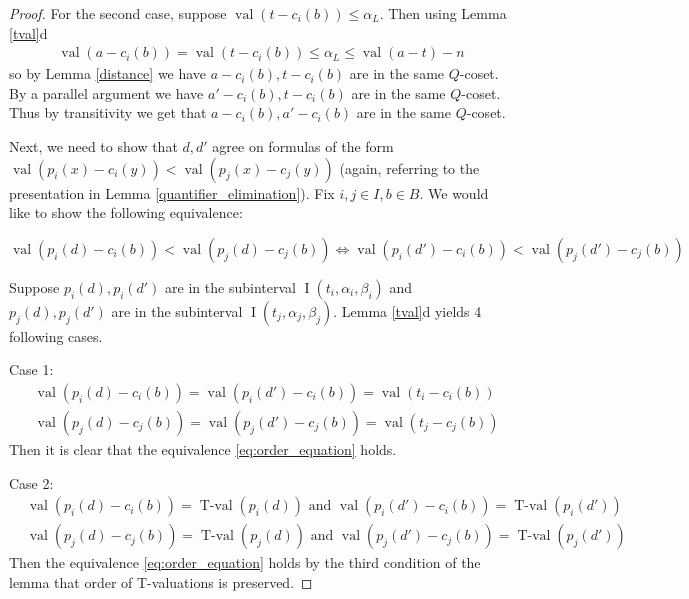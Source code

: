 \documentclass{amsart}
\DeclareMathOperator{\val}{val}
\DeclareMathOperator{\vval}{val}
\DeclareMathOperator{\tval}{T-val}
\DeclareMathOperator{\inti}{I}
\begin{document}
\begin{proof}
  For the second case, suppose $\val(t - c_i(b)) \leq \alpha_L$.
  Then using Lemma \ref{tval}d
  \begin{align*}
    \val(a - c_i(b)) = \val(t - c_i(b)) \leq \alpha_L \leq \val(a - t) - n
  \end{align*}
  so by Lemma \ref{distance} we have $a - c_i(b), t - c_i(b)$ are in the same $Q$-coset.
  By a parallel argument we have $a' - c_i(b), t - c_i(b)$ are in the same $Q$-coset.
  Thus by transitivity we get that $a - c_i(b), a' - c_i(b)$ are in the same $Q$-coset.

  Next, we need to show that $d, d'$ agree on formulas of the form
  $\vval (p_i(x) - c_i(y)) < \vval (p_j(x) - c_j(y))$ 
  (again, referring to the presentation in Lemma \ref{quantifier_elimination}).
  Fix $i,j \in I, b \in B$.
  We would like to show the following equivalence: 

  \begin{equation} \label {eq:order_equation}
	  \vval (p_i(d) - c_i(b)) < \vval (p_j(d) - c_j(b))  	  \iff \vval (p_i(d') - c_i(b)) < \vval (p_j(d') - c_j(b))
  \end{equation}

  Suppose $p_i(d), p_i(d')$ are in the subinterval $\inti(t_i, \alpha_i, \beta_i)$ and 
  $p_j(d), p_j(d')$ are in the subinterval $\inti(t_j, \alpha_j, \beta_j)$.
  Lemma \ref{tval}d yields 4 following cases.

  Case 1:
  \begin{align*}
    &\vval (p_i(d) - c_i(b)) = \vval (p_i(d') - c_i(b)) = \vval(t_i - c_i(b)) \\
    &\vval (p_j(d) - c_j(b)) = \vval (p_j(d') - c_j(b)) = \vval(t_j - c_j(b))
  \end{align*}
  Then it is clear that the equivalence \eqref{eq:order_equation} holds.

  Case 2:
  \begin{align*}
    &\vval (p_i(d) - c_i(b)) = \tval(p_i(d)) \text{ and } \vval (p_i(d') - c_i(b)) = \tval(p_i(d')) \\
    &\vval (p_j(d) - c_j(b)) = \tval(p_j(d)) \text{ and } \vval (p_j(d') - c_j(b)) = \tval(p_j(d'))
  \end{align*}
  Then the equivalence \eqref{eq:order_equation} holds by the third condition of the lemma that order of T-valuations is preserved.


\end{proof}
\end{document}
